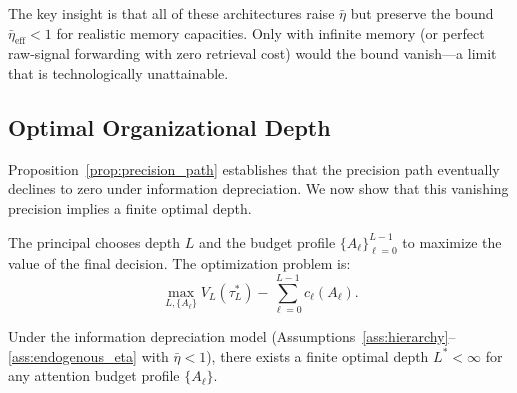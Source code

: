 The key insight is that all of these architectures raise $\bar{\eta}$ but preserve the bound $\bar{\eta}_{\text{eff}} < 1$ for realistic memory capacities. Only with infinite memory (or perfect raw-signal forwarding with zero retrieval cost) would the bound vanish---a limit that is technologically unattainable.

\subsection{Optimal Organizational Depth}
\label{subsec:optimal_depth}

Proposition~\ref{prop:precision_path} establishes that the precision path eventually declines to zero under information depreciation. We now show that this vanishing precision implies a finite optimal depth.

The principal chooses depth $L$ and the budget profile $\{A_\ell\}_{\ell=0}^{L-1}$ to maximize the value of the final decision. The optimization problem is:
\begin{equation}\label{eq:optimal_depth}
\max_{L, \{A_\ell\}} V_L(\tau^*_L) - \sum_{\ell=0}^{L-1} c_\ell(A_\ell).
\end{equation}

\begin{proposition}\label{prop:optimal_depth}
\label{prop:depth_finite}%
\label{prop:finite_depth}%
Under the information depreciation model (Assumptions~\ref{ass:hierarchy}--\ref{ass:endogenous_eta} with $\bar{\eta} < 1$), there exists a finite optimal depth $L^* < \infty$ for any attention budget profile $\{A_\ell\}$.
\end{proposition}

